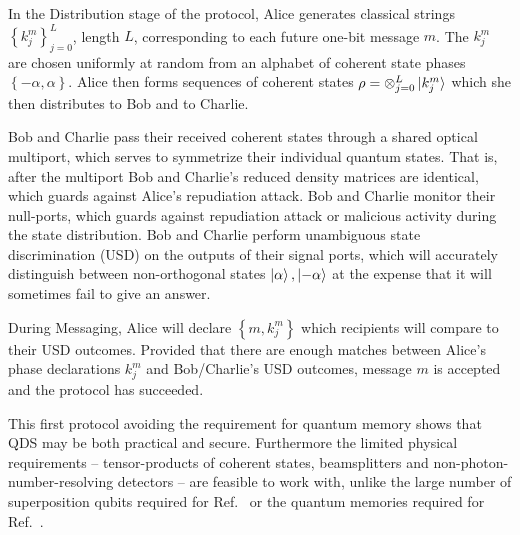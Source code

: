 In the Distribution stage of the protocol, Alice generates classical strings $\left\{k_j^m\right\}_{j=0}^L$, length $L$, corresponding to each future one-bit message $m$. The $k_j^m$ are chosen uniformly at random from an alphabet of coherent state phases $\left\{- \alpha, \alpha\right\}$. Alice then forms sequences of coherent states $\rho = \otimes_{j=0}^L \ket{k_j^m}$ which she then distributes to Bob and to Charlie. 

Bob and Charlie pass their received coherent states through a shared optical multiport, which serves to symmetrize their individual quantum states. That is, after the multiport Bob and Charlie's reduced density matrices are identical, which guards against Alice's repudiation attack. %
Bob and Charlie monitor their null-ports, which guards against repudiation attack or malicious activity during the state distribution. Bob and Charlie perform unambiguous state discrimination (USD) on the outputs of their signal ports, which will accurately distinguish between non-orthogonal states $\ket{\alpha}, \ket{-\alpha}$ at the expense that it will sometimes fail to give an answer.  %

During Messaging, Alice will declare $\left\{m, k_j^m\right\}$ which recipients will compare to their USD outcomes. Provided that there are enough matches between Alice's phase declarations $k_j^m$ and Bob/Charlie's USD outcomes, message $m$ is accepted and the protocol has succeeded.

This first protocol avoiding the requirement for quantum memory shows that QDS may be both practical and secure. Furthermore the limited physical requirements -- tensor-products of coherent states, beamsplitters and non-photon-number-resolving detectors -- are feasible to work with, unlike the large number of superposition qubits required for Ref.~\cite{Gottesman2001} or the quantum memories required for Ref.~\cite{Andersson2006}.

